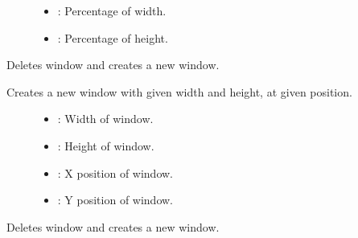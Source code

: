 \documentclass[letterpaper,10pt,english]{sphinxmanual}
\begin{document}
\begin{fulllineitems}
\begin{fulllineitems}
\begin{description}
\item[{}] \leavevmode\begin{itemize}
\item {} 
: Percentage of width. 

\item {} 
: Percentage of height. 

\end{itemize}

\end{description}


\end{fulllineitems}


\begin{fulllineitems}
\label{\detokenize{index:_CPPv2N7ostendo6Window9NewWindowEiiii}}%
\pysigstartmultiline
{}\label{\detokenize{index:Pessumclassostendo_1_1Window_1a90b76ea8f13d3eca15a08baf0e971804}}%
\pysigstopmultiline
Deletes window and creates a new window. 

Creates a new window with given width and height, at given position. \begin{description}
\item[{}] \leavevmode\begin{itemize}
\item {} 
: Width of window. 

\item {} 
: Height of window. 

\item {} 
: X position of window. 

\item {} 
: Y position of window. 

\end{itemize}

\end{description}


\end{fulllineitems}


\begin{fulllineitems}
\label{\detokenize{index:_CPPv2N7ostendo6Window9NewWindowEiidd}}%
\pysigstartmultiline
{}\label{\detokenize{index:Pessumclassostendo_1_1Window_1abffbcc2ef23f156ca9b6a4e04372e57b}}%
\pysigstopmultiline
Deletes window and creates a new window. 


\end{fulllineitems}
\end{fulllineitems}
\end{document}
